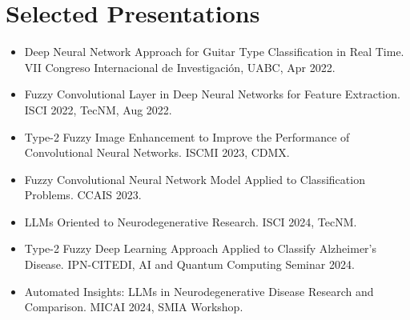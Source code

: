 \documentclass[letterpaper,11pt]{article}
\begin{document}
\section*{Selected Presentations}
\begin{itemize}[leftmargin=0.15in]
  \item Deep Neural Network Approach for Guitar Type Classification in Real Time. VII Congreso Internacional de Investigación, UABC, Apr 2022.
  \item Fuzzy Convolutional Layer in Deep Neural Networks for Feature Extraction. ISCI 2022, TecNM, Aug 2022.
  \item Type-2 Fuzzy Image Enhancement to Improve the Performance of Convolutional Neural Networks. ISCMI 2023, CDMX.
  \item Fuzzy Convolutional Neural Network Model Applied to Classification Problems. CCAIS 2023.
  \item LLMs Oriented to Neurodegenerative Research. ISCI 2024, TecNM.
  \item Type-2 Fuzzy Deep Learning Approach Applied to Classify Alzheimer's Disease. IPN-CITEDI, AI and Quantum Computing Seminar 2024.
  \item Automated Insights: LLMs in Neurodegenerative Disease Research and Comparison. MICAI 2024, SMIA Workshop.
\end{itemize}
\end{document}
